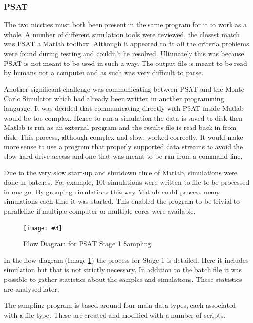 \documentclass[a4paper,oneside,12pt]{report}
\newcommand{\image}[3] {
  \begin{figure}
    \begin{center}
      \texttt{[image: \#3]}
      \caption{#2}
      \label{#1}
    \end{center}
  \end{figure}
}
\begin{document}
\subsubsection{PSAT}

The two niceties must both been present in the same program for it to work as a whole. A number of different simulation tools were reviewed, the closest match was PSAT a Matlab toolbox. Although it appeared to fit all the criteria problems were found during testing and couldn't be resolved. Ultimately this was because PSAT is not meant to be used in such a way. The output file is meant to be read by humans not a computer and as such was very difficult to parse. 

Another significant challenge was communicating between PSAT and the Monte Carlo Simulator which had already been written in another programming language. It was decided that communicating directly with PSAT inside Matlab would be too complex. Hence to run a simulation the data is saved to disk then Matlab is run as an external program and the results file is read back in from disk. This process, although complex and slow, worked correctly. It would make more sense to use a program that properly supported data streams to avoid the slow hard drive access and one that was meant to be run from a command line.

Due to the very slow start-up and shutdown time of Matlab, simulations were done in batches. For example, 100 simulations were written to file to be processed in one go. By grouping simulations this way Matlab could process many simulations each time it was started. This enabled the program to be trivial to parallelize if multiple computer or multiple cores were available.

\image{samplerflow}{Flow Diagram for PSAT Stage 1 Sampling}{samplerflow.png}

In the flow diagram (Image \ref{samplerflow}) the process for Stage 1 is detailed. Here it includes simulation but that is not strictly necessary. In addition to the batch file it was possible to gather statistics about the samples and simulations. These statistics are analysed later.

The sampling program is based around four main data types, each associated with a file type. These are created and modified with a number of scripts.
\end{document}
